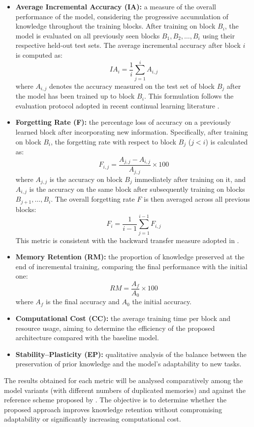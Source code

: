 \begin{itemize}
     \item \textbf{Average Incremental Accuracy (IA):} a measure of the overall performance 
    of the model, considering the progressive accumulation of knowledge throughout the 
    training blocks. After training on block $B_i$, the model is evaluated on all 
    previously seen blocks $B_1, B_2, \ldots, B_i$ using their respective held-out test 
    sets. The average incremental accuracy after block $i$ is computed as:
    \[
    IA_i = \frac{1}{i} \sum_{j=1}^{i} A_{i,j}
    \]
    where $A_{i,j}$ denotes the accuracy measured on the test set of block $B_j$ after 
    the model has been trained up to block $B_i$. This formulation follows the evaluation 
    protocol adopted in recent continual learning literature 
    \cite{de2021continual, rebuffi2017icarl}.

    \item \textbf{Forgetting Rate (F):} the percentage loss of accuracy on a previously 
    learned block after incorporating new information. Specifically, after training on 
    block $B_i$, the forgetting rate with respect to block $B_j$ ($j < i$) is calculated 
    as:
    \[
    F_{i,j} = \frac{A_{j,j} - A_{i,j}}{A_{j,j}} \times 100
    \]
    where $A_{j,j}$ is the accuracy on block $B_j$ immediately after training on it, 
    and $A_{i,j}$ is the accuracy on the same block after subsequently training on blocks 
    $B_{j+1}, \ldots, B_i$. The overall forgetting rate $F$ is then averaged across all 
    previous blocks:
    \[
    F_i = \frac{1}{i-1} \sum_{j=1}^{i-1} F_{i,j}
    \]
    This metric is consistent with the backward transfer measure adopted in 
    \cite{de2021continual, kirkpatrick2017overcoming, lopez2017gradient}.
    
    \item \textbf{Memory Retention (RM):} the proportion of knowledge preserved at the end of incremental training, comparing the final performance with the initial one:
    \[
    RM = \frac{A_{f}}{A_{0}} \times 100
    \]
    where $A_{f}$ is the final accuracy and $A_{0}$ the initial accuracy.
    
    \item \textbf{Computational Cost (CC):} the average training time per block and resource usage, aiming to determine the efficiency of the proposed architecture compared with the baseline model.
    
    \item \textbf{Stability–Plasticity (EP):} qualitative analysis of the balance between the preservation of prior knowledge and the model’s adaptability to new tasks.
\end{itemize}

The results obtained for each metric will be analysed comparatively among the model variants (with different numbers of duplicated memories) and against the reference scheme proposed by \cite{bullinaria2009}.  
The objective is to determine whether the proposed approach improves knowledge retention without compromising adaptability or significantly increasing computational cost.
